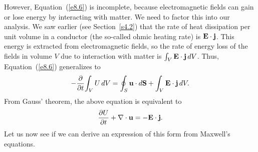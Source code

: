 However, Equation~(\ref{e8.6}) is incomplete, because electromagnetic fields can gain or lose energy
by interacting with matter. We need to factor this into our analysis. 
We saw earlier (see Section~\ref{s4.2}) 
that the rate of heat dissipation per unit volume in a
conductor (the so-called ohmic heating rate) is ${\bf E}\cdot{\bf j}$. 
This energy is extracted from electromagnetic fields, so the rate of energy
loss of the fields in volume $V$ due to interaction with matter is 
$\int_V {\bf E}\cdot{\bf j}\,dV$. Thus, Equation~(\ref{e8.6})  generalizes to 
\begin{equation}
-\frac{\partial}{\partial t} \!\int_V U\,dV= \oint_S {\bf u}\cdot d{\bf S}
+ \int_V {\bf E}\cdot{\bf j}\,dV.
\end{equation}
From Gauss' theorem, the above equation is equivalent to
\begin{equation}
\frac{\partial U}{\partial t} +\nabla\cdot {\bf u} = - {\bf E} \cdot {\bf j}.
\end{equation}
Let us now see if we can derive an expression of this form from Maxwell's equations. 

